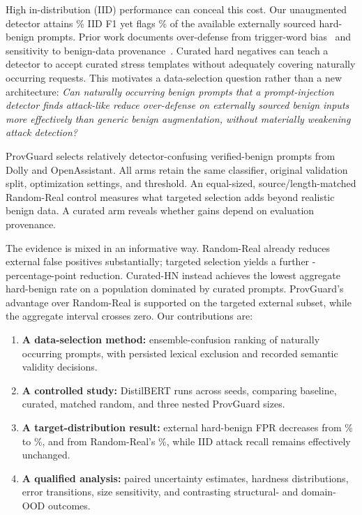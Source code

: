 \documentclass[conference]{IEEEtran}
\begin{document}
High in-distribution (IID) performance can conceal this cost. Our unaugmented detector attains \BaseIIDPct\% IID F1 yet flags \BaseExtPct\% of the available externally sourced hard-benign prompts. Prior work documents over-defense from trigger-word bias~\cite{piguard} and sensitivity to benign-data provenance~\cite{pids}. Curated hard negatives can teach a detector to accept curated stress templates without adequately covering naturally occurring requests. This motivates a data-selection question rather than a new architecture:
\emph{Can naturally occurring benign prompts that a prompt-injection detector finds attack-like reduce over-defense on externally sourced benign inputs more effectively than generic benign augmentation, without materially weakening attack detection?}

ProvGuard selects relatively detector-confusing verified-benign prompts from Dolly and OpenAssistant. All arms retain the same classifier, original validation split, optimization settings, and threshold. An equal-sized, source/length-matched Random-Real control measures what targeted selection adds beyond realistic benign data. A curated arm reveals whether gains depend on evaluation provenance.

The evidence is mixed in an informative way. Random-Real already reduces external false positives substantially; targeted selection yields a further \RandExtDropPP{}-percentage-point reduction. Curated-HN instead achieves the lowest aggregate hard-benign rate on a population dominated by curated prompts. ProvGuard's advantage over Random-Real is supported on the targeted external subset, while the aggregate interval crosses zero. Our contributions are:
\begin{enumerate}
\item \textbf{A data-selection method:} ensemble-confusion ranking of naturally occurring prompts, with persisted lexical exclusion and recorded semantic validity decisions.
\item \textbf{A controlled study:} \NRuns{} DistilBERT runs across \NSeeds{} seeds, comparing baseline, curated, matched random, and three nested ProvGuard sizes.
\item \textbf{A target-distribution result:} external hard-benign FPR decreases from \BaseExtPct\% to \PGExtPct\%, and from Random-Real's \RandExtPct\%, while IID attack recall remains effectively unchanged.
\item \textbf{A qualified analysis:} paired uncertainty estimates, hardness distributions, error transitions, size sensitivity, and contrasting structural- and domain-OOD outcomes.
\end{enumerate}
\end{document}
